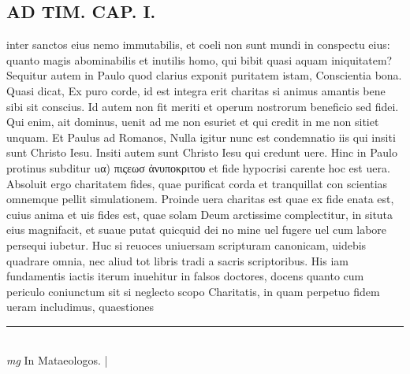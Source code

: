 \documentclass{article}
\begin{document}
\begin{pages}
\section*{AD TIM. CAP. I. }
\marginpar{[ p.99 ]}\pstart inter sanctos eius nemo immutabilis, et coeli non sunt mundi in conspectu eius: quanto magis abominabilis et inutilis homo, qui bibit quasi aquam iniquitatem? Sequitur autem in Paulo quod clarius exponit puritatem istam, Conscientia bona. Quasi dicat, Ex puro corde, id est integra erit charitas si animus amantis bene sibi sit conscius. Id autem non fit meriti et operum nostrorum beneficio sed fidei. Qui enim, ait dominus, uenit ad me non esuriet et qui credit in me non sitiet unquam. Et Paulus ad Romanos, Nulla igitur nunc est condemnatio iis qui insiti sunt Christo Iesu. Insiti autem sunt Christo Iesu qui credunt uere. Hinc in Paulo protinus subditur uα) πιςεωσ ἀνυποκριτου et fide hypocrisi carente hoc est uera. Absoluit ergo charitatem fides, quae purificat corda et tranquillat con scientias omnemque pellit simulationem. Proinde uera charitas est quae ex fide enata est, cuius anima et uis fides est, quae solam Deum arctissime complectitur, in situta eius magnifacit, et suaue putat quicquid dei no mine uel fugere uel cum labore persequi iubetur. Huc si reuoces uniuersam scripturam canonicam, uidebis quadrare omnia, nec aliud tot libris tradi a sacris scriptoribus. His iam fundamentis iactis iterum inuehitur in falsos doctores, docens quanto cum periculo coniunctum sit si neglecto scopo Charitatis, in quam perpetuo fidem ueram includimus, quaestiones  \pend
\vspace{0.5cm}\noindent
\vspace{0.2cm}\rule{1cm}{0.2pt}\\ 
\hspace{0.2cm}\textit{mg}
\footnotesize In Mataeologos. 
\normalsize| 

\end{pages}
\end{document}
